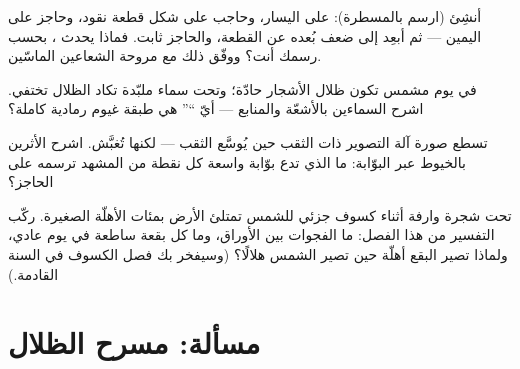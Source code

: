 \begin{exercise}[$\star\star$]\label{exo:g6:light-propagation:9}
أنشِئ (ارسم بالمسطرة):  على اليسار، وحاجب على شكل قطعة
نقود، وحاجز على اليمين --- ثم أبعِد \emph{} إلى ضعف
بُعده عن القطعة، والحاجز ثابت. فماذا يحدث  ، بحسب
رسمك أنت؟ ووفّق ذلك مع مروحة الشعاعين الماسّين.
\end{exercise}

\begin{exercise}[$\star\star$]\label{exo:g6:light-propagation:10}
في يوم مشمس تكون ظلال الأشجار حادّة؛ وتحت سماء ملبّدة تكاد
الظلال تختفي. اشرح السماءين بالأشعّة والمنابع --- أيّ ``''
هي طبقة غيوم رمادية كاملة؟
\end{exercise}

\begin{exercise}[$\star\star$]\label{exo:g6:light-propagation:11}
تسطع صورة آلة التصوير ذات الثقب حين يُوسَّع الثقب --- لكنها
تُغبَّش. اشرح الأثرين بالخيوط عبر البوّابة: ما الذي تدع بوّابة
واسعة كل نقطة من المشهد ترسمه على الحاجز؟
\end{exercise}

\begin{exercise}[$\star\star\star$]\label{exo:g6:light-propagation:12}
تحت شجرة وارفة أثناء كسوف جزئي للشمس تمتلئ الأرض بمئات
الأهلّة الصغيرة. ركّب التفسير من هذا الفصل: ما الفجوات بين
الأوراق، وما كل بقعة ساطعة في يوم عادي، ولماذا تصير البقع
أهلّة حين تصير الشمس هلالًا؟ (وسيفخر بك فصل الكسوف في السنة
القادمة.)
\end{exercise}

\section{مسألة: مسرح الظلال}

